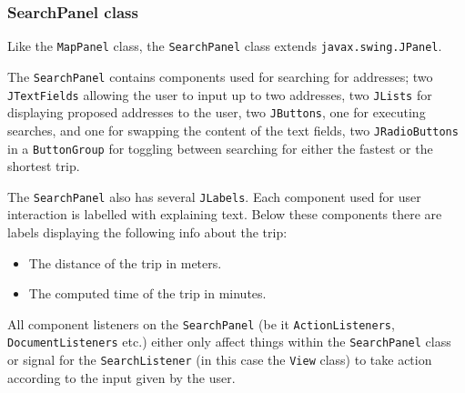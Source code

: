 \subsubsection{SearchPanel class}
Like the \texttt{MapPanel} class, the \texttt{SearchPanel} class extends \texttt{javax.swing.JPanel}.

The \texttt{SearchPanel} contains components used for searching for addresses; two \texttt{JTextFields} allowing the user to input up to two addresses, two \texttt{JLists} for displaying proposed addresses to the user, two \texttt{JButtons}, one for executing searches, and one for swapping the content of the text fields, two \texttt{JRadioButtons} in a \texttt{ButtonGroup} for toggling between searching for either the fastest or the shortest trip.

The \texttt{SearchPanel} also has several \texttt{JLabels}. Each component used for user interaction is labelled with explaining text. Below these components there are labels displaying the following info about the trip:
\begin{itemize}
 \item The distance of the trip in meters.
 \item The computed time of the trip in minutes.
\end{itemize}

All component listeners on the \texttt{SearchPanel} (be it \texttt{ActionListeners}, \texttt{DocumentListeners} etc.) either only affect things within the \texttt{SearchPanel} class or signal for the \texttt{SearchListener} (in this case the \texttt{View} class) to take action according to the input given by the user.

